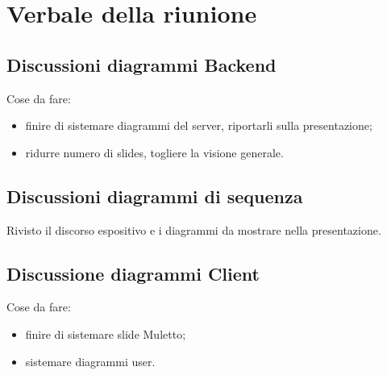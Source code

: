 \section{Verbale della riunione}

\subsection{Discussioni diagrammi Backend}
Cose da fare:
	\begin{itemize}
		\item finire di sistemare diagrammi del server, riportarli sulla presentazione;
		\item ridurre numero di slides, togliere la visione generale.
	\end{itemize}

\subsection{Discussioni diagrammi di sequenza}
Rivisto il discorso espositivo e i diagrammi da mostrare nella presentazione.

\subsection{Discussione diagrammi Client}
Cose da fare:
\begin{itemize}
	\item finire di sistemare slide Muletto;
	\item sistemare diagrammi user.
\end{itemize}